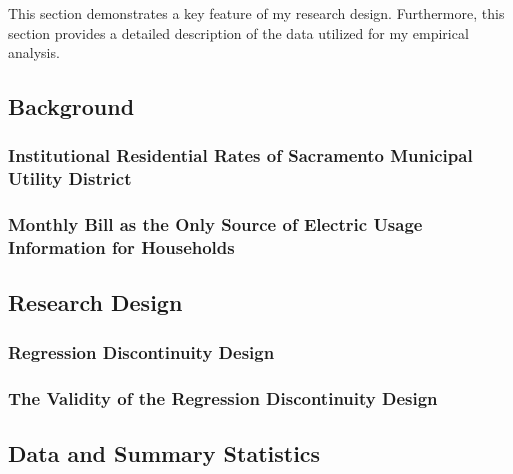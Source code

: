 This section demonstrates a key feature of my research design. Furthermore, this section provides a detailed description of the data utilized for my empirical analysis.


\subsection{Background}
\label{Sub-section:Background}

\subsubsection{Institutional Residential Rates of Sacramento Municipal Utility District}
\label{Sub-Sub-section:Residential-Rates-of-SMUD}


\subsubsection{Monthly Bill as the Only Source of Electric Usage Information for Households}
\label{Sub-Sub-section:Monthly-Bill-as-the-Only-Source-of-Electric-Usage-Information-for-Households}




\subsection{Research Design}
\label{Sub-Section:Research-Design}

\subsubsection{Regression Discontinuity Design}
\label{Sub-Sub-Section:Regression-Discontinuity-Design}


\subsubsection{The Validity of the Regression Discontinuity Design}
\label{Sub-Sub-Section:The-Validity-of-the-Regression-Discontinuity-Design}




\subsection{Data and Summary Statistics}
\label{Sub-section:Data-and-Summary-Statistics}

